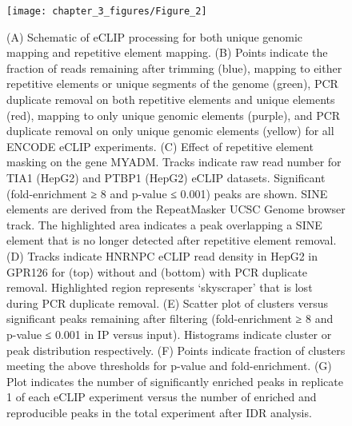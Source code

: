 \begin{figure}[ht]
  \centering
  \texttt{[image: chapter\_3\_figures/Figure\_2]}
  \caption[Figure 2. Development of the eCLIP processing pipeline]{(A) Schematic of eCLIP processing for both unique genomic mapping and repetitive element mapping. (B) Points indicate the fraction of reads remaining after trimming (blue), mapping to either repetitive elements or unique segments of the genome (green), PCR duplicate removal on both repetitive elements and unique elements (red), mapping to only unique genomic elements (purple), and PCR duplicate removal on only unique genomic elements (yellow) for all ENCODE eCLIP experiments. (C) Effect of repetitive element masking on the gene MYADM. Tracks indicate raw read number for TIA1 (HepG2) and PTBP1 (HepG2) eCLIP datasets. Significant (fold-enrichment ≥ 8 and p-value ≤ 0.001) peaks are shown. SINE elements are derived from the RepeatMasker UCSC Genome browser track. The highlighted area indicates a peak overlapping a SINE element that is no longer detected after repetitive element removal. (D) Tracks indicate HNRNPC eCLIP read density in HepG2 in GPR126 for (top) without and (bottom) with PCR duplicate removal. Highlighted region represents ‘skyscraper’ that is lost during PCR duplicate removal. (E) Scatter plot of clusters versus significant peaks remaining after filtering (fold-enrichment ≥ 8 and p-value ≤ 0.001 in IP versus input). Histograms indicate cluster or peak distribution respectively. (F) Points indicate fraction of clusters meeting the above thresholds for p-value and fold-enrichment. (G) Plot indicates the number of significantly enriched peaks in replicate 1 of each eCLIP experiment versus the number of enriched and reproducible peaks in the total experiment after IDR analysis.}
  \label{fig:Figure_2}
\end{figure}

